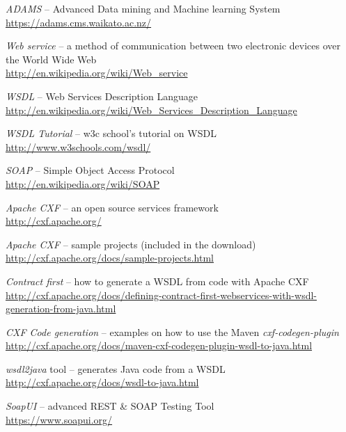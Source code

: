 %

\begin{thebibliography}{999}

		\textit{ADAMS} -- Advanced Data mining and Machine learning System \\
		{\scriptsize \url{https://adams.cms.waikato.ac.nz/}{}}
		
		\textit{Web service} -- a method of communication between two electronic 
		devices over the World Wide Web \\
		{\scriptsize \url{http://en.wikipedia.org/wiki/Web_service}{}}
		
		\textit{WSDL} -- Web Services Description Language \\
		{\scriptsize \url{http://en.wikipedia.org/wiki/Web_Services_Description_Language}{}}

		\textit{WSDL Tutorial} -- w3c school's tutorial on WSDL \\
		{\scriptsize \url{http://www.w3schools.com/wsdl/}{}}
		
		\textit{SOAP} -- Simple Object Access Protocol \\
		\url{http://en.wikipedia.org/wiki/SOAP}{}
		
		\textit{Apache CXF} -- an open source services framework \\
		{\scriptsize \url{http://cxf.apache.org/}{}}
		
		\textit{Apache CXF} -- sample projects (included in the download) \\
		{\scriptsize \url{http://cxf.apache.org/docs/sample-projects.html}{}}
		
		\textit{Contract first} -- how to generate a WSDL from code with Apache CXF \\
		{\scriptsize \url{http://cxf.apache.org/docs/defining-contract-first-webservices-with-wsdl-generation-from-java.html}{}}
		
		\textit{CXF Code generation} -- examples on how to use the Maven \textit{cxf-codegen-plugin} \\
		{\scriptsize \url{http://cxf.apache.org/docs/maven-cxf-codegen-plugin-wsdl-to-java.html}{}}
	
		\textit{wsdl2java} tool -- generates Java code from a WSDL \\
		{\scriptsize \url{http://cxf.apache.org/docs/wsdl-to-java.html}{}}

		\textit{SoapUI} -- advanced REST \& SOAP Testing Tool  \\
		{\scriptsize \url{https://www.soapui.org/}{}}

\end{thebibliography}
